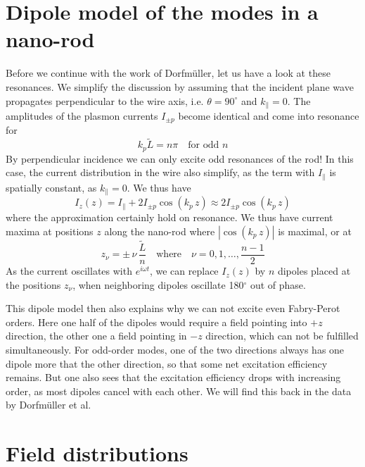 \section{Dipole model of the modes in a nano-rod}

Before we continue with the work of Dorfmüller, let us have a look at these resonances. 
We simplify the discussion by assuming that the incident plane wave propagates 
perpendicular to the wire axis, i.e. $\theta = 90^\circ$ and $k_\parallel = 0$. The 
amplitudes of the plasmon currents $I_{\pm p}$ become identical and come into resonance 
for 
\begin{equation}
  k_p \tilde{L} = n \pi \quad \text{for odd } n
\end{equation}
By perpendicular incidence we can only excite odd resonances of the rod! In this case, the current distribution in the wire also simplify, as the term with $I_\parallel$ is spatially constant, as $k_\parallel = 0$. We thus have
\begin{equation}
  I_z(z) = I_\parallel + 2 I_{\pm p} \cos ( k_p \, z) \approx  2 I_{\pm p} \cos ( k_p \, z)
\end{equation}
where the approximation certainly hold on resonance. We thus have current maxima at positions $z$ along the nano-rod where $|\cos ( k_p \, z)|$ is maximal, or at
\begin{equation}
  z_\nu = \pm \,  \nu \, \frac{\tilde{L}}{n} \quad \text{where} \quad \nu = 0, 1, \dots , \frac{n -1}{2}
\end{equation}
As the current oscillates with $e^{i \omega t}$, we can replace $I_z(z)$ by $n$ dipoles placed at the positions $z_\nu$, when neighboring dipoles oscillate 180$^\circ$ out of phase. 

This dipole model then also explains why we can not excite even Fabry-Perot orders. Here one half of the dipoles would require a field pointing into $+z$ direction, the other one a field pointing in $-z$ direction, which can not be fulfilled simultaneously. For odd-order modes, one of the two directions always has one dipole more that the other direction, so that some net excitation efficiency remains. But one also sees that the excitation efficiency drops with increasing order, as most dipoles cancel with each other. We will find this back in the data by Dorfmüller et al.


\section{Field distributions}

